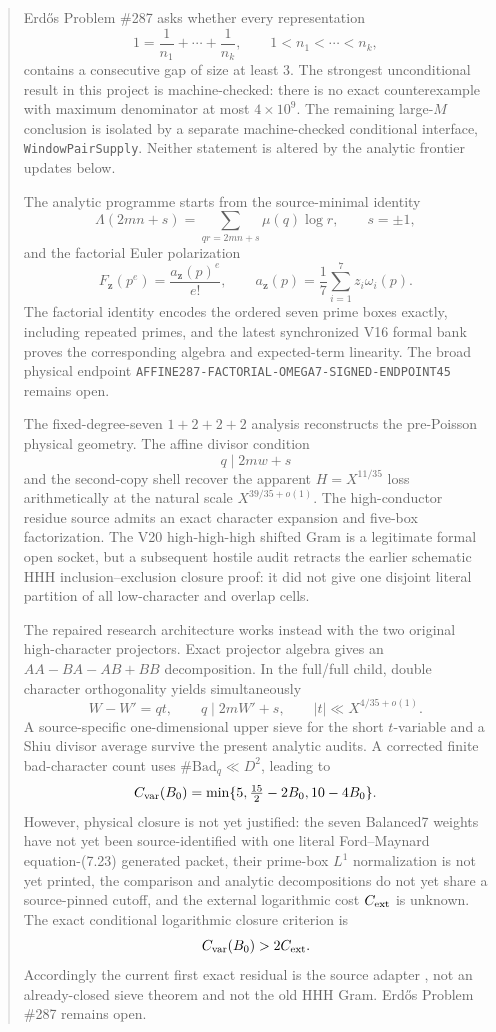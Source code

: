 \documentclass[11pt]{article}
\theoremstyle{definition}
\newcommand{\1}{\mathbf 1}
\begin{document}
\begin{abstract}
Erd\H{o}s Problem \#287 asks whether every representation
\[
1=\frac1{n_1}+\cdots+\frac1{n_k},\qquad 1<n_1<\cdots<n_k,
\]
contains a consecutive gap of size at least $3$.  The strongest unconditional result in
this project is machine-checked: there is no exact counterexample with maximum denominator
at most $4\times10^9$.  The remaining large-$M$ conclusion is isolated by a separate
machine-checked conditional interface, \texttt{WindowPairSupply}.  Neither statement is
altered by the analytic frontier updates below.

The analytic programme starts from the source-minimal identity
\[
\Lambda(2mn+s)=\sum_{qr=2mn+s}\mu(q)\log r,\qquad s=\pm1,
\]
and the factorial Euler polarization
\[
F_{\mathbf z}(p^e)=\frac{a_{\mathbf z}(p)^e}{e!},
\qquad
a_{\mathbf z}(p)=\frac17\sum_{i=1}^7z_i\omega_i(p).
\]
The factorial identity encodes the ordered seven prime boxes exactly, including repeated
primes, and the latest synchronized V16 formal bank proves the corresponding algebra and
expected-term linearity.  The broad physical endpoint
\texttt{AFFINE287-FACTORIAL-OMEGA7-SIGNED-ENDPOINT45} remains open.

The fixed-degree-seven $1+2+2+2$ analysis reconstructs the pre-Poisson physical geometry.
The affine divisor condition
\[
q\mid 2mw+s
\]
and the second-copy shell recover the apparent $H=X^{11/35}$ loss arithmetically at the
natural scale $X^{39/35+o(1)}$.  The high-conductor residue source admits an exact character
expansion and five-box factorization.  The V20 high-high-high shifted Gram is a legitimate
formal open socket, but a subsequent hostile audit retracts the earlier schematic HHH
inclusion--exclusion closure proof: it did not give one disjoint literal partition of all
low-character and overlap cells.

The repaired research architecture works instead with the two original high-character
projectors.  Exact projector algebra gives an $AA-BA-AB+BB$ decomposition.  In the full/full
child, double character orthogonality yields simultaneously
\[
W-W'=qt,\qquad q\mid 2mW'+s,\qquad |t|\ll X^{4/35+o(1)}.
\]
A source-specific one-dimensional upper sieve for the short $t$-variable and a Shiu divisor
average survive the present analytic audits.  A corrected finite bad-character count uses
$\#\mathrm{Bad}_q\ll D^2$, leading to
\[
C_{\rm var}(B_0)
=
\min\{5,\tfrac{15}{2}-2B_0,10-4B_0\}.
\]
However, physical closure is not yet justified: the seven Balanced7 weights have not yet
been source-identified with one literal Ford--Maynard equation-(7.23) generated packet,
their prime-box $L^1$ normalization is not yet printed, the comparison and analytic
decompositions do not yet share a source-pinned cutoff, and the external logarithmic cost
$C_{\rm ext}$ is unknown.  The exact conditional logarithmic closure criterion is
\[
C_{\rm var}(B_0)>2C_{\rm ext}.
\]
Accordingly the current first exact residual is the source adapter
, not an already-closed sieve theorem and
not the old HHH Gram.  Erd\H{o}s Problem \#287 remains open.
\end{abstract}
\end{document}
